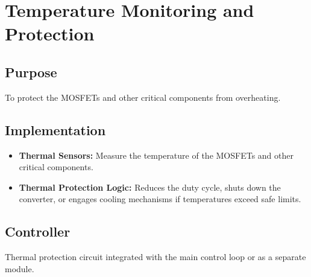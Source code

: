 \documentclass{article}
\begin{document}
\section{Temperature Monitoring and Protection}
\label{sec:temperature_monitoring}
\subsection{Purpose}
To protect the MOSFETs and other critical components from overheating.

\subsection{Implementation}
\begin{itemize}
    \item \textbf{Thermal Sensors:} Measure the temperature of the MOSFETs and other critical components.
    \item \textbf{Thermal Protection Logic:} Reduces the duty cycle, shuts down the converter, or engages cooling mechanisms if temperatures exceed safe limits.
\end{itemize}

\subsection{Controller}
Thermal protection circuit integrated with the main control loop or as a separate module.
\end{document}
